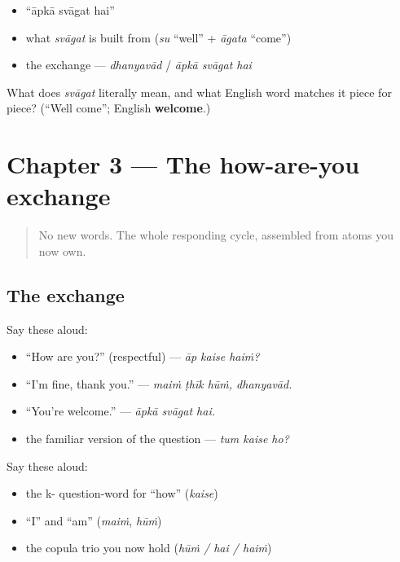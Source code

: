 \begin{itemize}
\raggedright
  \item \textquotedblleft{}āpkā svāgat hai\textquotedblright{}
  \item what \emph{svāgat} is built from (\emph{su} \textquotedblleft{}well\textquotedblright{} + \emph{āgata} \textquotedblleft{}come\textquotedblright{})
  \item the exchange — \emph{dhanyavād} / \emph{āpkā svāgat hai}
\end{itemize}

\begin{tcolorbox}[breakable,colback=teal!4,colframe=teal!35!black,title={Before you move on}]
What does \emph{svāgat} literally mean, and what English word matches it piece for piece? (\textquotedblleft{}Well come\textquotedblright{}; English \textbf{welcome}.)
\end{tcolorbox}
\section[Practice]{Chapter 3 — The how-are-you exchange}

\label{lesson:HI-C03-practice}



\begin{quote}
No new words. The whole responding cycle, assembled from atoms you now own.
\end{quote}

\subsection*{The exchange}
Say these aloud:

\begin{itemize}
\raggedright
  \item \textquotedblleft{}How are you?\textquotedblright{} (respectful) — \emph{āp kaise haiṁ?}
  \item \textquotedblleft{}I'm fine, thank you.\textquotedblright{} — \emph{maiṁ ṭhīk hūṁ, dhanyavād.}
  \item \textquotedblleft{}You're welcome.\textquotedblright{} — \emph{āpkā svāgat hai.}
  \item the familiar version of the question — \emph{tum kaise ho?}
\end{itemize}

\begin{cousinweb}
Say these aloud:

\begin{itemize}
\raggedright
  \item the k- question-word for \textquotedblleft{}how\textquotedblright{} (\emph{kaise})
  \item \textquotedblleft{}I\textquotedblright{} and \textquotedblleft{}am\textquotedblright{} (\emph{maiṁ}, \emph{hūṁ})
  \item the copula trio you now hold (\emph{hūṁ / hai / haiṁ})
\end{itemize}
\end{cousinweb}

